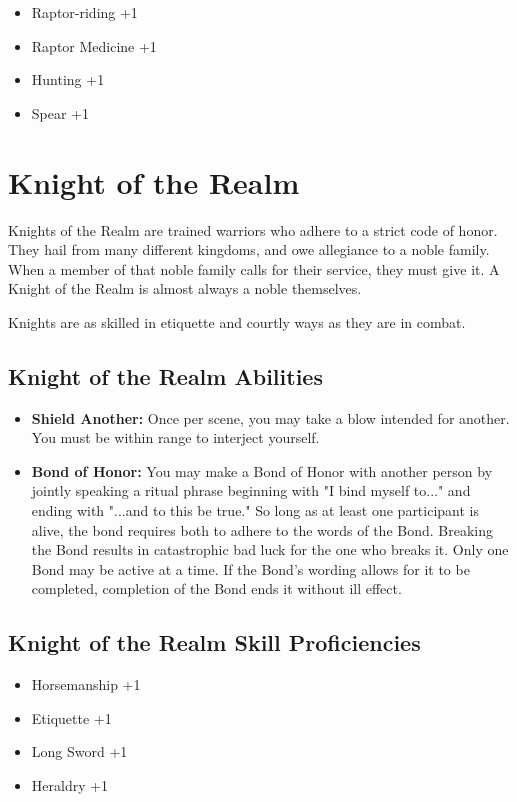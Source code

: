 \begin{multicols}{2}
\begin{itemize}
  \item Raptor-riding +1
  \item Raptor Medicine +1
  \item Hunting +1
  \item Spear +1
\end{itemize}

\section{Knight of the Realm}

Knights of the Realm are trained warriors who adhere to a strict code of
honor. They hail from many different kingdoms, and owe allegiance to a
noble family. When a member of that noble family calls for their service,
they must give it. A Knight of the Realm is almost always a noble themselves.

Knights are as skilled in etiquette and courtly ways as they are in combat.

\subsection{Knight of the Realm Abilities}

\begin{itemize}
  \item \textbf{Shield Another:} Once per scene, you may take a blow
    intended for another. You must be within range to interject yourself.
  \item \textbf{Bond of Honor:} You may make a Bond of Honor with another
    person by jointly speaking a ritual phrase beginning with "I bind myself
    to..." and ending with "...and to this be true." So long as at least one
    participant is alive, the bond requires both to adhere to the words of
    the Bond. Breaking the Bond results in catastrophic bad luck for the
    one who breaks it. Only one Bond may be active at a time. If the Bond's
    wording allows for it to be completed, completion of the Bond ends it
    without ill effect.
\end{itemize}

\subsection{Knight of the Realm Skill Proficiencies}

\begin{itemize}
  \item Horsemanship +1
  \item Etiquette +1
  \item Long Sword +1
  \item Heraldry +1
\end{itemize}


\end{multicols}
